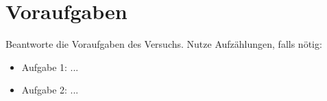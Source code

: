 \section{Voraufgaben}
Beantworte die Voraufgaben des Versuchs. Nutze Aufzählungen, falls nötig:
\begin{itemize}
    \item Aufgabe 1: ...
    \item Aufgabe 2: ...
\end{itemize}
